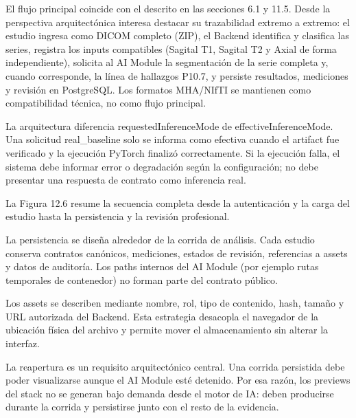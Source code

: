 El flujo principal coincide con el descrito en las secciones 6.1 y 11.5. Desde la perspectiva arquitectónica interesa destacar su trazabilidad extremo a extremo: el estudio ingresa como DICOM completo (ZIP), el Backend identifica y clasifica las series, registra los inputs compatibles (Sagital T1, Sagital T2 y Axial de forma independiente), solicita al AI Module la segmentación de la serie completa y, cuando corresponde, la línea de hallazgos P10.7, y persiste resultados, mediciones y revisión en PostgreSQL. Los formatos MHA/NIfTI se mantienen como compatibilidad técnica, no como flujo principal.

La arquitectura diferencia requestedInferenceMode de effectiveInferenceMode. Una solicitud real\_baseline solo se informa como efectiva cuando el artifact fue verificado y la ejecución PyTorch finalizó correctamente. Si la ejecución falla, el sistema debe informar error o degradación según la configuración; no debe presentar una respuesta de contrato como inferencia real.

La Figura 12.6 resume la secuencia completa desde la autenticación y la carga del estudio hasta la persistencia y la revisión profesional.


La persistencia se diseña alrededor de la corrida de análisis. Cada estudio conserva contratos canónicos, mediciones, estados de revisión, referencias a assets y datos de auditoría. Los paths internos del AI Module (por ejemplo rutas temporales de contenedor) no forman parte del contrato público.

Los assets se describen mediante nombre, rol, tipo de contenido, hash, tamaño y URL autorizada del Backend. Esta estrategia desacopla el navegador de la ubicación física del archivo y permite mover el almacenamiento sin alterar la interfaz.

La reapertura es un requisito arquitectónico central. Una corrida persistida debe poder visualizarse aunque el AI Module esté detenido. Por esa razón, los previews del stack no se generan bajo demanda desde el motor de IA: deben producirse durante la corrida y persistirse junto con el resto de la evidencia.

